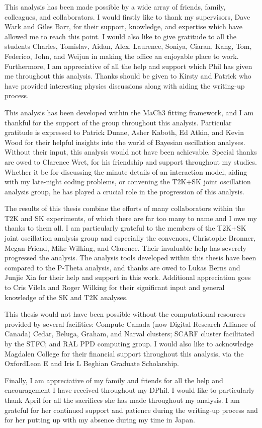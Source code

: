 This analysis has been made possible by a wide array of friends, family, colleagues, and collaborators. I would firstly like to thank my supervisors, Dave Wark and Giles Barr, for their support, knowledge, and expertise which have allowed me to reach this point. I would also like to give gratitude to all the students \textendash \vspace{1mm} Charles, Tomislav, Aidan, Alex, Laurence, Soniya, Ciaran, Kang, Tom, Federico, John, and Weijun \textendash \vspace{1mm} in making the office an enjoyable place to work. Furthermore, I am appreciative of all the help and support which Phil has given me throughout this analysis. Thanks should be given to Kirsty and Patrick who have provided interesting physics discussions along with aiding the writing-up process. 

This analysis has been developed within the MaCh3 fitting framework, and I am thankful for the support of the group throughout this analysis. Particular gratitude is expressed to Patrick Dunne, Asher Kaboth, Ed Atkin, and Kevin Wood for their helpful insights into the world of Bayesian oscillation analyses. Without their input, this analysis would not have been achievable. Special thanks are owed to Clarence Wret, for his friendship and support throughout my studies. Whether it be for discussing the minute details of an interaction model, aiding with my late-night coding problems, or convening the T2K+SK joint oscillation analysis group, he has played a crucial role in the progression of this analysis.

The results of this thesis combine the efforts of many collaborators within the T2K and SK experiments, of which there are far too many to name and I owe my thanks to them all. I am particularly grateful to the members of the T2K+SK joint oscillation analysis group and especially the convenors, Christophe Bronner, Megan Friend, Mike Wilking, and Clarence. Their invaluable help has severely progressed the analysis. The analysis tools developed within this thesis have been compared to the P-Theta analysis, and thanks are owed to Lukas Berns and Junjie Xia for their help and support in this work. Additional appreciation goes to Cris Vilela and Roger Wilking for their significant input and general knowledge of the SK and T2K analyses.

This thesis would not have been possible without the computational resources provided by several facilities: Compute Canada (now Digital Research Alliance of Canada) Cedar, Beluga, Graham, and Narval clusters; SCARF cluster facilitated by the STFC; and RAL PPD computing group. I would also like to acknowledge Magdalen College for their financial support throughout this analysis, via the Oxford\textendash Leon E and Iris L Beghian Graduate Scholarship.

Finally, I am appreciative of my family and friends for all the help and encouragement I have received throughout my DPhil. I would like to particularly thank April for all the sacrifices she has made throughout my analysis. I am grateful for her continued support and patience during the writing-up process and for her putting up with my absence during my time in Japan.
